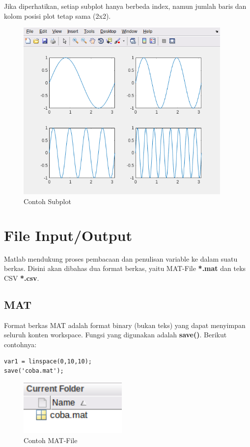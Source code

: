 \documentclass[12pt]{book}
\begin{document}
	Jika diperhatikan, setiap subplot hanya berbeda index, namun jumlah baris dan kolom posisi plot tetap sama (2x2).

	\begin{figure}[!ht]
		\centering
		\includegraphics[width=300pt]{images/subplot}
		\caption{Contoh Subplot}
	\end{figure}

	\section{File Input/Output}
	
	Matlab mendukung proses pembacaan dan penulisan variable ke dalam suatu berkas.
	Disini akan dibahas dua format berkas, yaitu MAT-File \textbf{*.mat} dan teks CSV \textbf{*.csv}.
	
	\subsection{MAT}
	
	Format berkas MAT adalah format binary (bukan teks) yang dapat menyimpan seluruh konten workspace.
	Fungsi yang digunakan adalah \textbf{save()}.
	Berikut contohnya:
	
	\begin{verbatim}
var1 = linspace(0,10,10);
save('coba.mat');
	\end{verbatim}

	\begin{figure}[!ht]
		\centering
		\includegraphics[width=150pt]{images/matfile}
		\caption{Contoh MAT-File}
	\end{figure}
\end{document}
